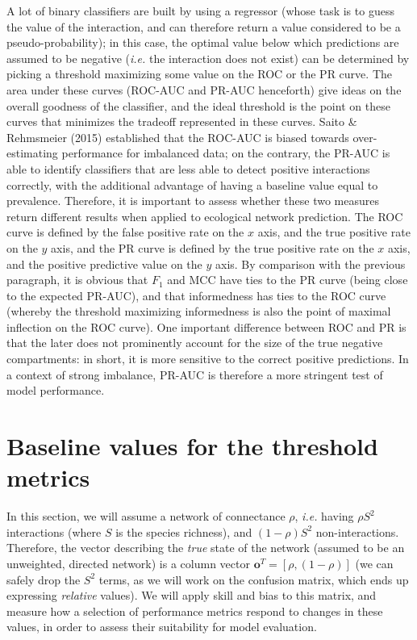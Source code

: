 \documentclass[11pt]{article}
\begin{document}
A lot of binary classifiers are built by using a regressor (whose task
is to guess the value of the interaction, and can therefore return a
value considered to be a pseudo-probability); in this case, the optimal
value below which predictions are assumed to be negative (\emph{i.e.}
the interaction does not exist) can be determined by picking a threshold
maximizing some value on the ROC or the PR curve. The area under these
curves (ROC-AUC and PR-AUC henceforth) give ideas on the overall
goodness of the classifier, and the ideal threshold is the point on
these curves that minimizes the tradeoff represented in these curves.
Saito \& Rehmsmeier (2015) established that the ROC-AUC is biased
towards over-estimating performance for imbalanced data; on the
contrary, the PR-AUC is able to identify classifiers that are less able
to detect positive interactions correctly, with the additional advantage
of having a baseline value equal to prevalence. Therefore, it is
important to assess whether these two measures return different results
when applied to ecological network prediction. The ROC curve is defined
by the false positive rate on the \(x\) axis, and the true positive rate
on the \(y\) axis, and the PR curve is defined by the true positive rate
on the \(x\) axis, and the positive predictive value on the \(y\) axis.
By comparison with the previous paragraph, it is obvious that \(F_1\)
and MCC have ties to the PR curve (being close to the expected PR-AUC),
and that informedness has ties to the ROC curve (whereby the threshold
maximizing informedness is also the point of maximal inflection on the
ROC curve). One important difference between ROC and PR is that the
later does not prominently account for the size of the true negative
compartments: in short, it is more sensitive to the correct positive
predictions. In a context of strong imbalance, PR-AUC is therefore a
more stringent test of model performance.

\hypertarget{baseline-values-for-the-threshold-metrics}{%
\section{Baseline values for the threshold
metrics}\label{baseline-values-for-the-threshold-metrics}}

In this section, we will assume a network of connectance \(\rho\),
\emph{i.e.} having \(\rho S^2\) interactions (where \(S\) is the species
richness), and \((1-\rho) S^2\) non-interactions. Therefore, the vector
describing the \emph{true} state of the network (assumed to be an
unweighted, directed network) is a column vector
\(\mathbf{o}^T = [\rho, (1-\rho)]\) (we can safely drop the \(S^2\)
terms, as we will work on the confusion matrix, which ends up expressing
\emph{relative} values). We will apply skill and bias to this matrix,
and measure how a selection of performance metrics respond to changes in
these values, in order to assess their suitability for model evaluation.
\end{document}
